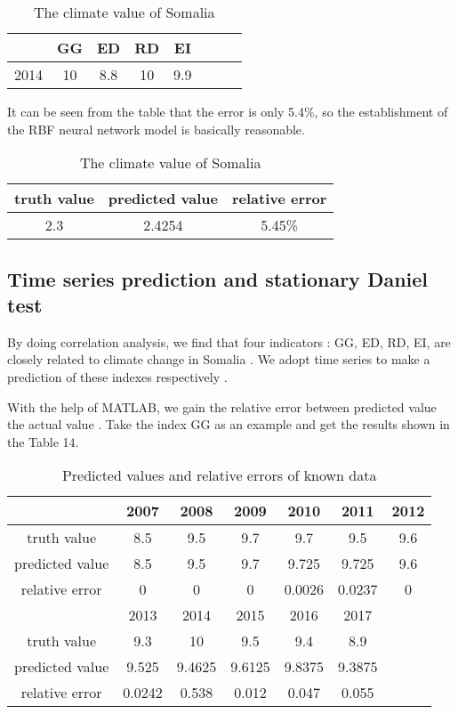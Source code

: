 \documentclass{mcmthesis}
\begin{document}
\begin{table}[htbp]
\centering
\caption{The climate value of Somalia}
\begin{tabular}{c|ccccccc}   %
\hline
 & GG & ED & RD  & EI\\
\hline
2014 &10 &	8.8&	10&	9.9\\
\hline
\end{tabular}
\end{table}

It can be seen from the table that the error is only 5.4\%, so the establishment of the RBF neural network model is basically reasonable.


\begin{table}[htbp]
\centering
\caption{The climate value of Somalia}

\begin{tabular}{|c|c|c|}   %
\hline
truth value & predicted value  &relative error\\
\hline
2.3&2.4254	&5.45\%\\
\hline
\end{tabular}
\end{table}

\subsection{Time series prediction and stationary Daniel test}
By doing correlation analysis, we find that four indicators : GG, ED, RD, EI,  are closely related to climate change in Somalia .
We adopt time series to make a prediction of these indexes respectively .

With the help of MATLAB, we gain the relative error between predicted value  the actual value . Take the index GG as an example and get the results shown in the Table 14.

\begin{table}[htbp]
\centering
\caption{Predicted values and relative errors of known data}
\begin{tabular}{c|c|c|c|c|c|c}   %
\hline
  & 2007	&2008	&2009	&2010	&2011	&2012\\
\hline
truth value & 8.5	&9.5	&9.7	&9.7&	9.5	&9.6\\

\hline
predicted value &8.5&	9.5&	9.7	&9.725&	9.725&	9.6\\

\hline
relative error&0&0&0&0.0026&0.0237&0\\
\hline

\hline
\hline
  & 2013	&2014	&2015	&2016	&2017	\\
\hline
truth value & 9.3	&10	&9.5&	9.4&	8.9\\

\hline
predicted value &9.525&	9.4625& 	9.6125&	 9.8375& 	9.3875\\

\hline
relative error&0.0242&0.538&0.012&0.047&0.055\\
\hline
\hline
\end{tabular}
\end{table}
\end{document}
